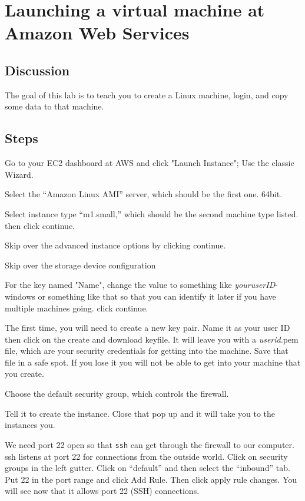 \chapter{Launching a virtual machine at Amazon Web Services}
\label{ch:1}

\setcounter{problem}{1}

\section{Discussion}

\begin{fullwidth}

The goal of this lab is to teach you to create a Linux machine, login, and copy some data to that machine.

\section{Steps}

\step Go to your EC2 dashboard at AWS and click "Launch Instance"; Use the classic Wizard.

\step Select the ``Amazon Linux AMI'' server, which should be the first one. 64bit.

\step Select instance type ``m1.small,'' which should be the second machine type listed. then click continue.

\step Skip over the advanced instance options by clicking continue.

\step Skip over the storage device configuration

\step For the key named "Name", change the value to something like {\em youruserID}-windows or something like that so that you can identify it later if you have multiple machines going. click continue.

\step The first time, you will need to create a new key pair. Name it as your user ID then click on the create and download keyfile. It will leave you with a {\em userid}.pem file, which are your security credentials for getting into the machine. Save that file in a safe spot. If you lose it you will not be able to get into your machine that you create.

\step Choose the default security group, which controls the firewall.

\step Tell it to create the instance. Close that pop up and it will take you to the instances you.

\step We need port 22 open so that {\tt ssh} can get through the firewall to our computer. ssh listens at port 22 for connections from the outside world. Click on security groups in the left gutter. Click on ``default'' and then select the ``inbound'' tab. Put 22 in the port range and click Add Rule. Then click apply rule changes. You will see now that it allows port 22 (SSH) connections.


\end{fullwidth}
